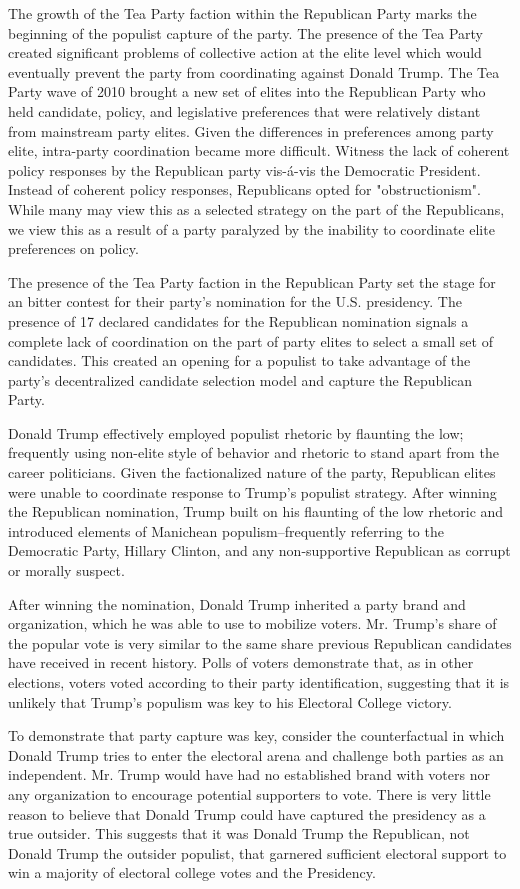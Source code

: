 \documentclass[a4paper,12pt]{article}\usepackage[]{graphicx}\usepackage[]{color}
\begin{document}
\par
The growth of the Tea Party faction within the Republican Party marks the beginning of the populist capture of the party. The presence of the Tea Party created significant problems of collective action at the elite level which would eventually prevent the party from coordinating against Donald Trump. The Tea Party wave of 2010 brought a new set of elites into the Republican Party who held candidate, policy, and legislative preferences that were relatively distant from mainstream party elites. Given the differences in preferences among party elite, intra-party coordination became more difficult. Witness the lack of coherent policy responses by the Republican party vis-\'{a}-vis the Democratic President. Instead of coherent policy responses, Republicans opted for "obstructionism". While many may view this as a selected strategy on the part of the Republicans, we view this as a result of a party paralyzed by the inability to coordinate elite preferences on policy. 
\par
The presence of the Tea Party faction in the Republican Party set the stage for an bitter contest for their party's nomination for the U.S. presidency. The presence of 17 declared candidates for the Republican nomination signals a complete lack of coordination on the part of party elites to select a small set of candidates. This created an opening for a populist to take advantage of the party's decentralized candidate selection model and capture the Republican Party. 
\par
Donald Trump effectively employed populist rhetoric by flaunting the low; frequently using non-elite style of behavior and rhetoric to stand apart from the career politicians. Given the factionalized nature of the party, Republican elites were unable to coordinate response to Trump's populist strategy. After winning the Republican nomination, Trump built on his flaunting of the low rhetoric and introduced elements of Manichean populism--frequently referring to the Democratic Party, Hillary Clinton, and any non-supportive Republican as corrupt or morally suspect. 
\par
After winning the nomination, Donald Trump inherited a party brand and organization, which he was able to use to mobilize voters. Mr. Trump's share of the popular vote is very similar to the same share previous Republican candidates have received in recent history. Polls of voters demonstrate that, as in other elections, voters voted according to their party identification, suggesting that it is unlikely that Trump's populism was key to his Electoral College victory. 
\par
To demonstrate that party capture was key, consider the counterfactual in which Donald Trump tries to enter the electoral arena and challenge both parties as an independent. Mr. Trump would have had no established brand with voters nor any organization to encourage potential supporters to vote. There is very little reason to believe that Donald Trump could have captured the presidency as a true outsider. This suggests that it was Donald Trump the Republican, not Donald Trump the outsider populist, that garnered sufficient electoral support to win a majority of electoral college votes and the Presidency. 
\end{document}
